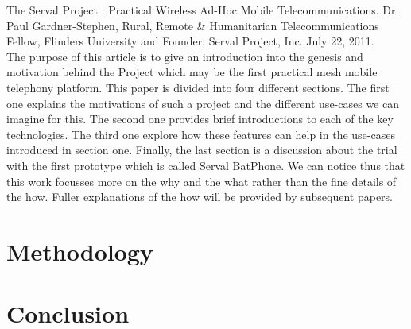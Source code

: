 \documentclass[a4paper, 11pt, oneside]{Thesis}  %
\begin{document}
The Serval Project : Practical Wireless Ad-Hoc Mobile Telecommunications. Dr. Paul Gardner-Stephen, Rural, Remote & Humanitarian Telecommunications Fellow, Flinders University and Founder, Serval Project, Inc. July 22, 2011. \\

The purpose of this article is to give an introduction into the genesis and motivation behind the Project which may be the first practical mesh mobile telephony platform.  This paper is divided into four different sections. The first one explains the motivations of such a project and the different use-cases we can imagine for this. The second one provides brief introductions to each of the key technologies. The third one explore how these features can help in the use-cases introduced in section one. Finally, the last section is a discussion about the trial with the first prototype which is called Serval BatPhone. We can notice thus that this work focusses more on the why and the what rather than the fine details of the how. Fuller explanations of the how will be provided by subsequent papers. 

\section{Methodology}
\section{Conclusion}



\backmatter
\end{document}
